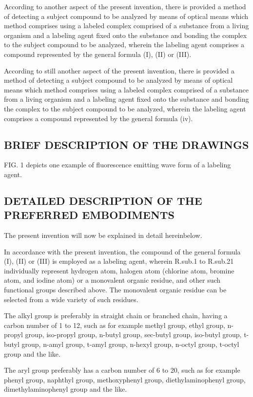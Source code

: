 \documentclass[11pt,a4paper]{article}
\begin{document}
According to another aspect of the present invention, there is provided a method of detecting a subject compound to be analyzed by means of optical means which method comprises using a labeled complex comprised of a substance from a living organism and a labeling agent fixed onto the substance and bonding the complex to the subject compound to be analyzed, wherein the labeling agent comprises a compound represented by the general formula (I), (II) or (III).

According to still another aspect of the present invention, there is provided a method of detecting a subject compound to be analyzed by means of optical means which method comprises using a labeled complex comprised of a substance from a living organism and a labeling agent fixed onto the substance and bonding the complex to the subject compound to be analyzed, wherein the labeling agent comprises a compound represented by the general formula (iv).

\subsection{BRIEF DESCRIPTION OF THE DRAWINGS}

FIG. 1 depicts one example of fluorescence emitting wave form of a labeling agent.

\subsection{DETAILED DESCRIPTION OF THE PREFERRED EMBODIMENTS}

The present invention will now be explained in detail hereinbelow.

In accordance with the present invention, the compound of the general formula (I), (II) or (III) is employed as a labeling agent, wherein R.sub.1 to R.sub.21 individually represent hydrogen atom, halogen atom (chlorine atom, bromine atom, and iodine atom) or a monovalent organic residue, and other such functional groups described above. The monovalent organic residue can be selected from a wide variety of such residues.

The alkyl group is preferably in straight chain or branched chain, having a carbon number of 1 to 12, such as for example methyl group, ethyl group, n-propyl group, iso-propyl group, n-butyl group, sec-butyl group, iso-butyl group, t-butyl group, n-amyl group, t-amyl group, n-hexyl group, n-octyl group, t-octyl group and the like.

The aryl group preferably has a carbon number of 6 to 20, such as for example phenyl group, naphthyl group, methoxyphenyl group, diethylaminophenyl group, dimethylaminophenyl group and the like.
\end{document}
